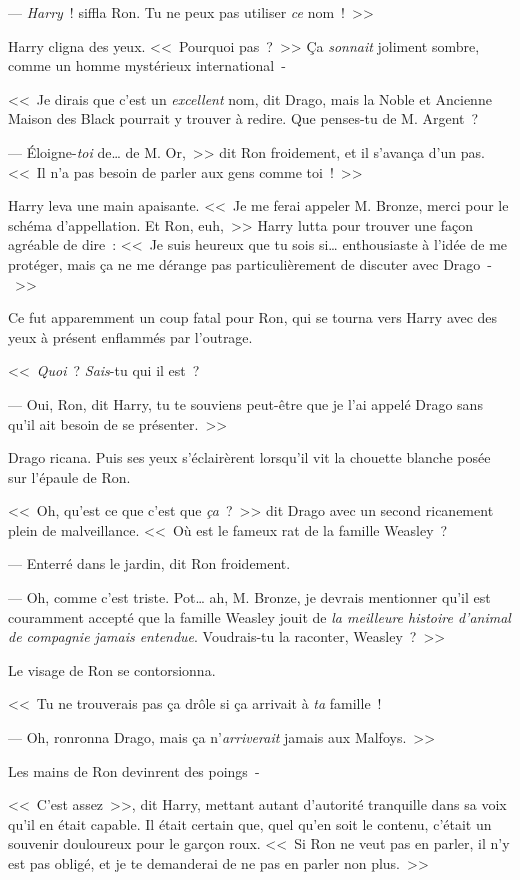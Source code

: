 --- \emph{Harry}~! siffla Ron. Tu ne peux pas utiliser \emph{ce} nom~!~>>

Harry cligna des yeux. <<~Pourquoi pas~?~>> Ça \emph{sonnait} joliment sombre, comme un homme mystérieux international~-

<<~Je dirais que c'est un \emph{excellent} nom, dit Drago, mais la Noble et Ancienne Maison des Black pourrait y trouver à redire. Que penses-tu de M. Argent~?

--- Éloigne-\emph{toi} de… de M. Or,~>> dit Ron froidement, et il s'avança d'un pas. <<~Il n'a pas besoin de parler aux gens comme toi~!~>>

Harry leva une main apaisante. <<~Je me ferai appeler M. Bronze, merci pour le schéma d'appellation. Et Ron, euh,~>> Harry lutta pour trouver une façon agréable de dire~: <<~Je suis heureux que tu sois si… enthousiaste à l'idée de me protéger, mais ça ne me dérange pas particulièrement de discuter avec Drago~-~>>

Ce fut apparemment un coup fatal pour Ron, qui se tourna vers Harry avec des yeux à présent enflammés par l'outrage.

<<~\emph{Quoi}~? \emph{Sais}-tu qui il est~?

--- Oui, Ron, dit Harry, tu te souviens peut-être que je l'ai appelé Drago sans qu'il ait besoin de se présenter.~>>

Drago ricana. Puis ses yeux s'éclairèrent lorsqu'il vit la chouette blanche posée sur l'épaule de Ron.

<<~Oh, qu'est ce que c'est que \emph{ça}~?~>> dit Drago avec un second ricanement plein de malveillance. <<~Où est le fameux rat de la famille Weasley~?

--- Enterré dans le jardin, dit Ron froidement.

--- Oh, comme c'est triste. Pot… ah, M. Bronze, je devrais mentionner qu'il est couramment accepté que la famille Weasley jouit de \emph{la meilleure histoire d'animal de compagnie jamais entendue}. Voudrais-tu la raconter, Weasley~?~>>

Le visage de Ron se contorsionna.

<<~Tu ne trouverais pas ça drôle si ça arrivait à \emph{ta} famille~!

--- Oh, ronronna Drago, mais ça n'\emph{arriverait} jamais aux Malfoys.~>>

Les mains de Ron devinrent des poings~-

<<~C'est assez~>>, dit Harry, mettant autant d'autorité tranquille dans sa voix qu'il en était capable. Il était certain que, quel qu'en soit le contenu, c'était un souvenir douloureux pour le garçon roux. <<~Si Ron ne veut pas en parler, il n'y est pas obligé, et je te demanderai de ne pas en parler non plus.~>>


